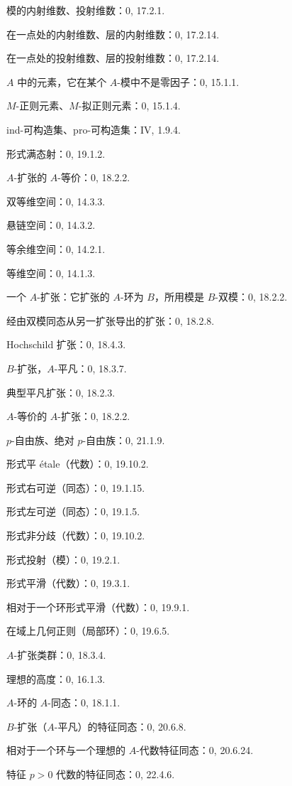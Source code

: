 \clearpage
{}
模的内射维数、投射维数：0, 17.2.1.\par
在一点处的内射维数、层的内射维数：0, 17.2.14.\par
在一点处的投射维数、层的投射维数：0, 17.2.14.\par

$A$ 中的元素，它在某个 $A$-模中不是零因子：0, 15.1.1.\par
$M$-正则元素、$M$-拟正则元素：0, 15.1.4.\par
ind-可构造集、pro-可构造集：IV, 1.9.4.\par
形式满态射：0, 19.1.2.\par
$A$-扩张的 $A$-等价：0, 18.2.2.\par
双等维空间：0, 14.3.3.\par
悬链空间：0, 14.3.2.\par
等余维空间：0, 14.2.1.\par
等维空间：0, 14.1.3.\par
一个 $A$-扩张：它扩张的 $A$-环为 $B$，所用模是 $B$-双模：0, 18.2.2.\par
经由双模同态从另一扩张导出的扩张：0, 18.2.8.\par
Hochschild 扩张：0, 18.4.3.\par
$B$-扩张，$A$-平凡：0, 18.3.7.\par
典型平凡扩张：0, 18.2.3.\par
$A$-等价的 $A$-扩张：0, 18.2.2.\par

$p$-自由族、绝对 $p$-自由族：0, 21.1.9.\par
形式平 étale（代数）：0, 19.10.2.\par
形式右可逆（同态）：0, 19.1.15.\par
形式左可逆（同态）：0, 19.1.5.\par
形式非分歧（代数）：0, 19.10.2.\par
形式投射（模）：0, 19.2.1.\par
形式平滑（代数）：0, 19.3.1.\par
相对于一个环形式平滑（代数）：0, 19.9.1.\par

在域上几何正则（局部环）：0, 19.6.5.\par
$A$-扩张类群：0, 18.3.4.\par

理想的高度：0, 16.1.3.\par
$A$-环的 $A$-同态：0, 18.1.1.\par
$B$-扩张（$A$-平凡）的特征同态：0, 20.6.8.\par
相对于一个环与一个理想的 $A$-代数特征同态：0, 20.6.24.\par
特征 $p>0$ 代数的特征同态：0, 22.4.6.\par

